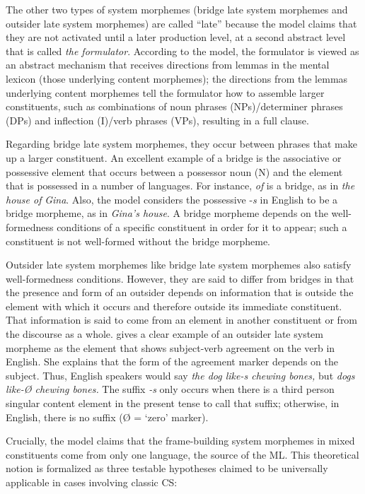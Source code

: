 \documentclass[output=paper]{langsci/langscibook}
\begin{document}
The other two types of system morphemes (bridge late system morphemes and outsider late system morphemes) are called “late” because the model claims that they are not activated until a later production level, at a second abstract level that is called \textit{the formulator}. According to the model, the formulator is viewed as an abstract mechanism that receives directions from lemmas in the mental lexicon (those underlying content morphemes); the directions from the lemmas underlying content morphemes tell the formulator how to assemble larger constituents, such as combinations of noun phrases (NPs)/determiner phrases (DPs) and inflection (I)/verb phrases (VPs), resulting in a full clause. 

Regarding bridge late system morphemes, they occur between phrases that make up a larger constituent. An excellent example of a bridge is the associative or possessive element that occurs between a possessor noun (N) and the element that is possessed in a number of languages. For instance, \textit{of} is a bridge, as in \textit{the house of}\textbf{\textit{}} \textit{Gina}. Also, the model considers the possessive -\textit{s} in English to be a bridge morpheme, as in \textit{Gina’s house}. A bridge morpheme depends on the well-formedness conditions of a specific constituent in order for it to appear; such a constituent is not well-formed without the bridge morpheme. 

Outsider late system morphemes like bridge late system morphemes also satisfy well-formedness conditions. However, they are said to differ from bridges in that the presence and form of an outsider depends on information that is outside the element with which it occurs and therefore outside its immediate constituent. That information is said to come from an element in another constituent or from the discourse as a whole. \citet{MyersScotton2002,MyersScotton2006,MyersScotton2013} gives a clear example of an outsider late system morpheme as the element that shows subject-verb agreement on the verb in English. She explains that the form of the agreement marker depends on the subject. Thus, English speakers would say \textit{the dog like-s chewing bones,} but \textit{dogs like-Ø chewing bones.} The suffix \textit{-s} only occurs when there is a third person singular content element in the present tense to call that suffix; otherwise, in English, there is no suffix (Ø = ‘zero’ marker).

Crucially, the model claims that the frame-building system morphemes in mixed constituents come from only one language, the source of the ML. This theoretical notion is formalized as three testable hypotheses claimed to be universally applicable in cases involving classic CS:
\end{document}
